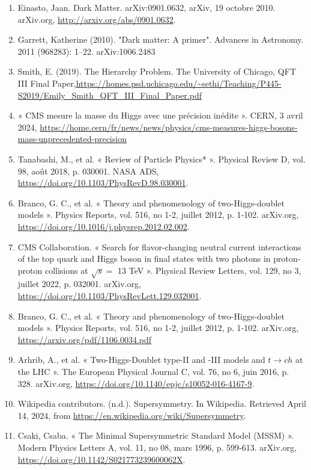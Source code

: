 \documentclass [12pt] {article}
\numberwithin{equation}{section} %
\numberwithin{figure}{section}   %
\begin{document}
\begin{enumerate}
    \item Einasto, Jaan. Dark Matter. arXiv:0901.0632, arXiv, 19 octobre 2010. arXiv.org, \url{http://arxiv.org/abs/0901.0632}. \label{DM2}
    \item Garrett, Katherine (2010). "Dark matter: A primer". Advances in Astronomy. 2011 (968283): 1–22. arXiv:1006.2483 \label{wimps}
    \item Smith, E. (2019). The Hierarchy Problem. The University of Chicago, QFT III Final Paper,\url{https://homes.psd.uchicago.edu/~sethi/Teaching/P445-S2019/Emily_Smith_QFT_III_Final_Paper.pdf} \label{Hierarchy}
    \item  « CMS mesure la masse du Higgs avec une précision inédite ». CERN, 3 avril 2024, \url{https://home.cern/fr/news/news/physics/cms-measures-higgs-bosons-mass-unprecedented-precision} \label{higgs mass}
    \item Tanabashi, M., et al. « Review of Particle Physics* ». Physical Review D, vol. 98, août 2018, p. 030001. NASA ADS, \url{https://doi.org/10.1103/PhysRevD.98.030001}. \label{W mass}
    \item Branco, G. C., et al. « Theory and phenomenology of two-Higgs-doublet models ». Physics Reports, vol. 516, no 1‑2, juillet 2012, p. 1‑102. arXiv.org, \url{https://doi.org/10.1016/j.physrep.2012.02.002}. \label{types of 2HDM}
    \item CMS Collaboration. « Search for flavor-changing neutral current interactions of the top quark and Higgs boson in final states with two photons in proton-proton collisions at $\sqrt{s} =$ 13 TeV ». Physical Review Letters, vol. 129, no 3, juillet 2022, p. 032001. arXiv.org, \url{https://doi.org/10.1103/PhysRevLett.129.032001}. \label{FCNC}
    \item Branco, G. C., et al. « Theory and phenomenology of two-Higgs-doublet models ». Physics Reports, vol. 516, no 1‑2, juillet 2012, p. 1‑102. arXiv.org, \url{https://arxiv.org/pdf/1106.0034.pdf} \label{type 3 bis}
    \item Arhrib, A., et al. « Two-Higgs-Doublet type-II and -III models and $t\to c h$ at the LHC ». The European Physical Journal C, vol. 76, no 6, juin 2016, p. 328. arXiv.org, \url{https://doi.org/10.1140/epjc/s10052-016-4167-9}. \label{type 3}
    \item Wikipedia contributors. (n.d.). Supersymmetry. In Wikipedia. Retrieved April 14, 2024, from \url{https://en.wikipedia.org/wiki/Supersymmetry}.
    \item Csaki, Csaba. « The Minimal Supersymmetric Standard Model (MSSM) ». Modern Physics Letters A, vol. 11, no 08, mars 1996, p. 599‑613. arXiv.org, \url{https://doi.org/10.1142/S021773239600062X}. \label{mssm}

\end{enumerate}
\end{document}
